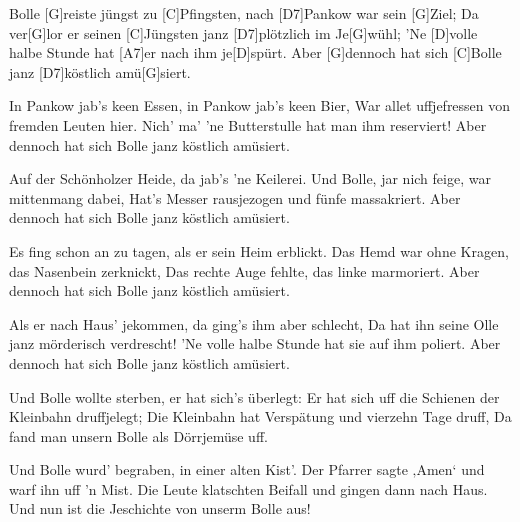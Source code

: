 \begin{spacing}{0.96}%


\begin{guitar}
	Bolle [G]reiste jüngst zu [C]Pfingsten, nach [D7]Pankow war sein [G]Ziel;
	Da ver[G]lor er seinen [C]Jüngsten janz [D7]plötzlich im Je[G]wühl;
	’Ne [D]volle halbe Stunde hat [A7]er nach ihm je[D]spürt.
	Aber [G]dennoch hat sich [C]Bolle janz [D7]köstlich amü[G]siert. 
	
	In Pankow jab’s keen Essen, in Pankow jab’s keen Bier,
	War allet uffjefressen von fremden Leuten hier.
	Nich’ ma’ ’ne Butterstulle hat man ihm reserviert!
	Aber dennoch hat sich Bolle janz köstlich amüsiert. 
	
	Auf der Schönholzer Heide, da jab’s ’ne Keilerei.
	Und Bolle, jar nich feige, war mittenmang dabei,
	Hat’s Messer rausjezogen und fünfe massakriert.
	Aber dennoch hat sich Bolle janz köstlich amüsiert. 
	
	Es fing schon an zu tagen, als er sein Heim erblickt.
	Das Hemd war ohne Kragen, das Nasenbein zerknickt,
	Das rechte Auge fehlte, das linke marmoriert.
	Aber dennoch hat sich Bolle janz köstlich amüsiert. 
	
	Als er nach Haus’ jekommen, da ging’s ihm aber schlecht,
	Da hat ihn seine Olle janz mörderisch verdrescht!
	’Ne volle halbe Stunde hat sie auf ihm poliert.
	Aber dennoch hat sich Bolle janz köstlich amüsiert. 
	
	Und Bolle wollte sterben, er hat sich’s überlegt:
	Er hat sich uff die Schienen der Kleinbahn druffjelegt;
	Die Kleinbahn hat Verspätung und vierzehn Tage druff,
	Da fand man unsern Bolle als Dörrjemüse uff. 
	
	Und Bolle wurd’ begraben, in einer alten Kist’.
	Der Pfarrer sagte ‚Amen‘ und warf ihn uff ’n Mist.
	Die Leute klatschten Beifall und gingen dann nach Haus.
	Und nun ist die Jeschichte von unserm Bolle aus!\vfill%
\end{guitar}
\end{spacing}